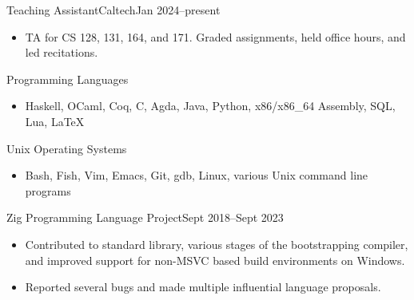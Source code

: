 \documentclass[a4paper,10pt]{article}
\begin{document}
    \begin{description}[topsep=4pt, partopsep=0pt, itemsep=-2pt]
    \end{description}

    \begin{activity*}{Teaching Assistant}{Caltech}{Jan 2024--present}
      \begin{itemize}[label={}, nosep]
        \item TA for CS 128, 131, 164, and 171. Graded assignments, held office hours, and led recitations.
      \end{itemize}
    \end{activity*}

    \begin{skill}{Programming Languages}
      \begin{itemize}[label={},topsep=4pt, partopsep=0pt, itemsep=-2pt]
        \item Haskell, OCaml, Coq, C, Agda, Java, Python, x86/x86\_64 Assembly, SQL, Lua, \LaTeX{}
      \end{itemize}
    \end{skill}

    \begin{skill}{Unix Operating Systems}
      \begin{itemize}[label={}, topsep=4pt, partopsep=0pt, itemsep=-2pt]
        \item Bash, Fish, Vim, Emacs, Git, gdb, Linux, various Unix command line programs
     \end{itemize}
    \end{skill}

    \begin{activity}{Zig Programming Language Project}{Sept 2018--Sept 2023}
      \begin{itemize}[topsep=4pt, partopsep=0pt, itemsep=-2pt]
        \item Contributed to standard library, various stages of the bootstrapping compiler, and improved support for non-MSVC based build environments on Windows.
        \item Reported several bugs and made multiple influential language proposals.
      \end{itemize}
    \end{activity}
\end{document}
